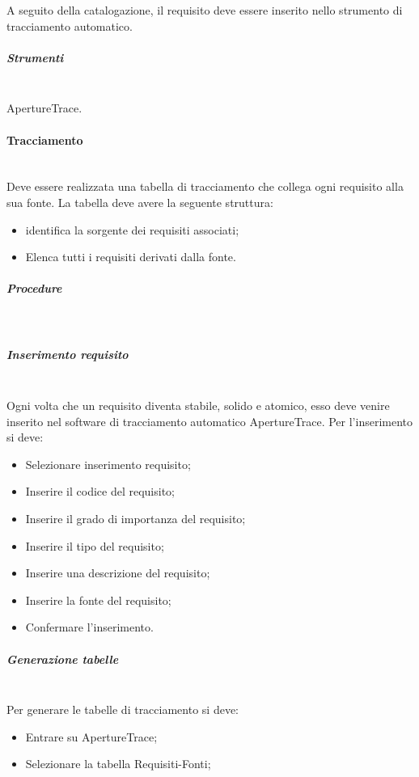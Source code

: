 A seguito della catalogazione, il requisito deve essere inserito nello strumento di tracciamento automatico.


\subparagraph{Strumenti} \hfill \\
ApertureTrace.

\paragraph{Tracciamento} \hfill \\

Deve essere realizzata una tabella di tracciamento che collega ogni requisito alla sua fonte.
La tabella deve avere la seguente struttura:

\begin{itemize}
\item {} identifica la sorgente dei requisiti associati;
\item {} Elenca tutti i requisiti derivati dalla fonte.
\end{itemize}


\subparagraph{Procedure} \hfill \\
\subparagraph{Inserimento requisito} \hfill \\
Ogni volta che un requisito diventa stabile, solido e atomico, esso deve venire inserito nel software di tracciamento automatico ApertureTrace. 
Per l'inserimento si deve:
\begin{itemize}
\item Selezionare inserimento requisito;
\item Inserire il codice del requisito;
\item Inserire il grado di importanza del requisito;
\item Inserire il tipo del requisito;
\item Inserire una descrizione del requisito;
\item Inserire la fonte del requisito;
\item Confermare l'inserimento.
\end{itemize}

\subparagraph{Generazione tabelle} \hfill \\
Per generare le tabelle di tracciamento si deve:

\begin{itemize}
\item Entrare su ApertureTrace;
\item Selezionare la tabella Requisiti-Fonti;

\end{itemize}


